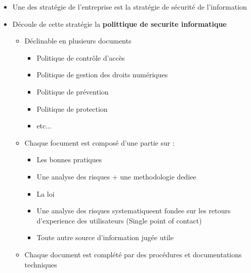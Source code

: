 \documentclass[a4paper]{article}
\begin{document}
\begin{itemize}[label=\textbullet, font=\Large]
\begin{itemize}[label=, font=\scriptsize]
\begin{itemize}
    \end{itemize}
  \end{itemize}
  \item Une des stratégie de l'entreprise est la stratégie de sécurité de l'information
  \item Découle de cette stratégie la \textbf{polittique de securite informatique}
  \begin{itemize}[label=, font=\scriptsize]
    \item Déclinable en plusieurs documents
    \begin{itemize}
      \item Politique de contrôle d’accès
      \item Politique de gestion des droits numériques
      \item Politique de prévention
      \item Politique de protection
      \item etc...
    \end{itemize}
    \item Chaque focument est composé d'une partie sur :
    \begin{itemize}
      \item Les bonnes pratiques
      \item Une analyse des risques + une methodologie dediee
      \item La loi
      \item Une analyse des risques systematiqueent fondee sur les retours d'experience des utilisateurs (Single point of contact)
      \item Toute autre source d'information jugée utile
    \end{itemize}
    \item Chaque document est complété par des procédures et documentations techniques
  \end{itemize}
\end{itemize}
\end{document}
